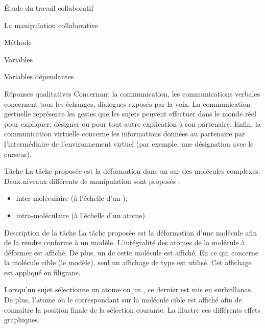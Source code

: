 \documentclass[myfrancais]{mythesis}
\begin{document}
\begin{mypart}{Étude du travail collaboratif}
\begin{mychapter}{La manipulation collaborative}
\begin{mysection}{Méthode}
\begin{mysubsection}{Variables}
\begin{mysubsubsection}{Variables dépendantes}
\begin{myparagraph}{ Réponses qualitatives}
							Concernant la communication, les communications verbales concernent tous les échanges, dialogues exposés par la voix.
							La communication gestuelle représente les gestes que les sujets peuvent effectuer dans le monde réel pour expliquer, désigner ou pour tout autre explication à son partenaire.
							Enfin, la communication virtuelle concerne les informations données au partenaire par l'intermédiaire de l'environnement virtuel (par exemple, une désignation avec le curseur).
						\end{myparagraph}
					\end{mysubsubsection}
				\end{mysubsection}
				\begin{mysubsection}[sse-exp2-Tache]{Tâche}
					La tâche proposée est la déformation dans un  sur des molécules complexes.
					Deux niveaux différents de manipulation sont proposés :
					\begin{itemize}
						\item inter-moléculaire (à l'échelle d'un );
						\item intra-moléculaire (à l'échelle d'un atome).
					\end{itemize}

					\begin{mysubsubsection}{Description de la tâche}
						La tâche proposée est la déformation d'une molécule afin de la rendre conforme à un modèle.
						L'intégralité des atomes de la molécule à déformer est affiché.
						De plus, un  de cette molécule est affiché.
						En ce qui concerne la molécule cible (le modèle), seul un affichage de type  est utilisé.
						Cet affichage est appliqué en filigrane.

						Lorsqu'un sujet sélectionne un atome ou un , ce dernier est mis en surbrillance.
						De plus, l'atome ou le  correspondant sur la molécule cible est affiché afin de connaître la position finale de la sélection courante.
						La  illustre ces différents effets graphiques.


\end{mysubsubsection}
\end{mysubsection}
\end{mysection}
\end{mychapter}
\end{mypart}
\end{document}
